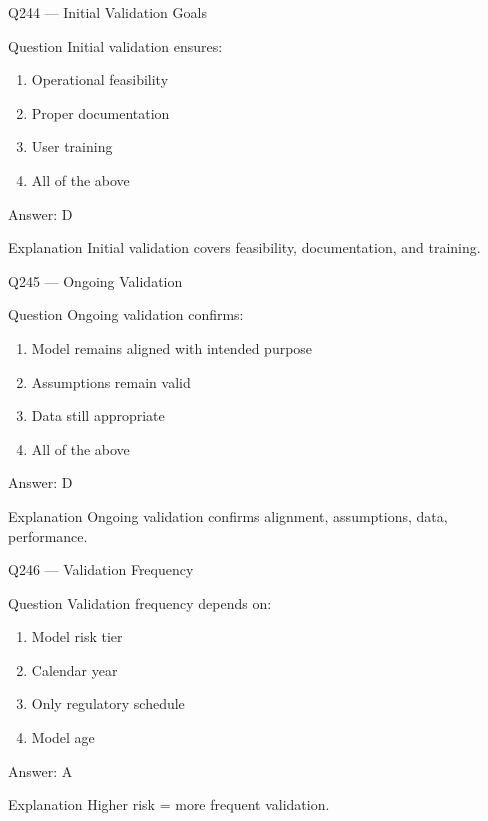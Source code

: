 \documentclass[aspectratio=169,8pt]{beamer}
\begin{document}
\begin{frame}{Q244 --- Initial Validation Goals}
\begin{block}{Question}
Initial validation ensures:
\begin{enumerate}
\item Operational feasibility
\item Proper documentation
\item User training
\item All of the above
\end{enumerate}
\end{block}
\begin{exampleblock}{Answer: D}\end{exampleblock}
\begin{block}{Explanation}
Initial validation covers feasibility, documentation, and training.
\end{block}
\end{frame}

\begin{frame}{Q245 --- Ongoing Validation}
\begin{block}{Question}
Ongoing validation confirms:
\begin{enumerate}
\item Model remains aligned with intended purpose
\item Assumptions remain valid
\item Data still appropriate
\item All of the above
\end{enumerate}
\end{block}
\begin{exampleblock}{Answer: D}\end{exampleblock}
\begin{block}{Explanation}
Ongoing validation confirms alignment, assumptions, data, performance.
\end{block}
\end{frame}

\begin{frame}{Q246 --- Validation Frequency}
\begin{block}{Question}
Validation frequency depends on:
\begin{enumerate}
\item Model risk tier
\item Calendar year
\item Only regulatory schedule
\item Model age
\end{enumerate}
\end{block}
\begin{exampleblock}{Answer: A}\end{exampleblock}
\begin{block}{Explanation}
Higher risk = more frequent validation.
\end{block}
\end{frame}
\end{document}
